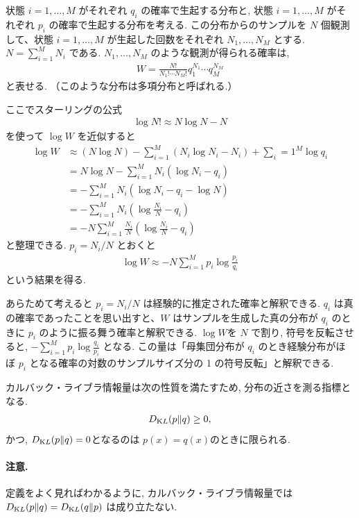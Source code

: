 \documentclass[a4paper, 12pt]{jarticle}
\begin{document}
状態 $i=1,\ldots,M$ がそれぞれ $q_i$ の確率で生起する分布と, 状態 $i=1,\ldots,M$ がそれぞれ $p_i$ の確率で生起する分布を考える. この分布からのサンプルを $N$ 個観測して、状態 $i=1,\ldots,M$ が生起した回数をそれぞれ $N_1,\ldots,N_M$ とする. $ N=\sum_{i=1}^{M}N_i$ である. 
$N_1,\ldots,N_M$ のような観測が得られる確率は,
\begin{align}
W=\frac{N!}{N_1! \cdots N_M!}q^{N_1}_1 \cdots q^{N_M}_M
\end{align}
と表せる. （このような分布は多項分布と呼ばれる.）

ここでスターリングの公式
\begin{align}
\log N! \approx N\log N -N
\end{align}
を使って $\log W$ を近似すると
\begin{align}
\log W &\approx (N \log N) - \sum_{i=1}^{M}( N_i \log N_i -N_i) + \sum_i=1^{M} \log q_i \\
&= N \log N - \sum_{i=1}^M N_i (\log N_i - q_i) \\
&= - \sum_{i=1}^M N_i (\log N_i - q_i -\log N ) \\
&= - \sum_{i=1}^M N_i (\log \frac{N_i}{N} - q_i) \\
&= - N \sum_{i=1}^M \frac{N_i}{N} (\log \frac{N_i}{N} - q_i) 
\end{align}
と整理できる.
$p_i = N_i/N$ とおくと
\begin{align}
\log W \approx -N\sum_{i=1}^{M}p_i \log\frac{p_i}{q_i}
\end{align}
という結果を得る.

あらためて考えると $p_i = N_i/N$  は経験的に推定された確率と解釈できる.
$q_i$ は真の確率であったことを思い出すと、$W$ はサンプルを生成した真の分布が $q_i$ のときに $p_i$ のように振る舞う確率と解釈できる. 
$\log W$を $N$ で割り, 符号を反転させると, $-\sum_{i=1}^{M} p_i \log {\frac {q_i}{p_i}}$ となる.
この量は「母集団分布が $q_i$ のとき経験分布がほぼ $p_i$ となる確率の対数のサンプルサイズ分の 1 の符号反転」と解釈できる.

カルバック・ライブラ情報量は次の性質を満たすため, 分布の近さを測る指標となる. 
\begin{align}
D_{\mathrm KL}(p\|q) \ge 0,
\end{align}
かつ, $D_{\mathrm KL}(p\|q) = 0$となるのは $p(x)=q(x)$のときに限られる.

\paragraph{注意.}
定義をよく見ればわかるように, カルバック・ライブラ情報量では $D_{\mathrm KL}(p\|q) =D_{\mathrm KL}(q\|p)$ は成り立たない. 
\end{document}
